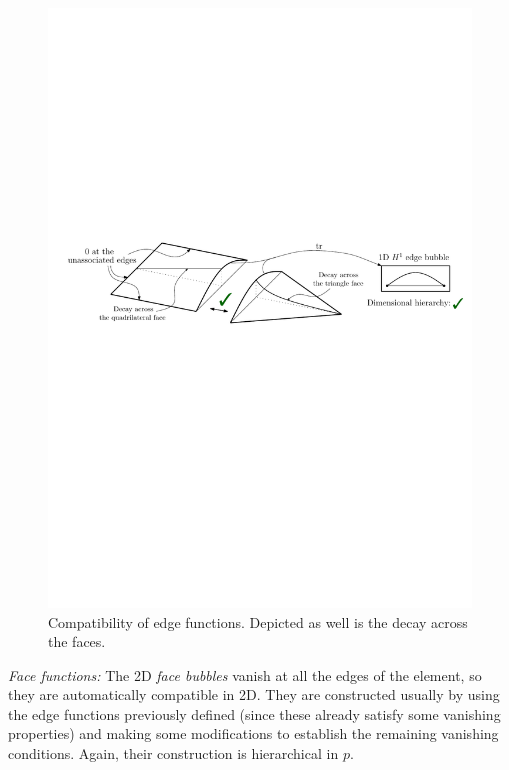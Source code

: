 \begin{figure}[!ht]
\begin{center}
\includegraphics[scale=0.7]{./figures/EdgeBlendingQuadTri.pdf}
\caption{Compatibility of edge functions. Depicted as well is the decay across the faces.}
\label{fig:2Dedgecompatibility}
\end{center}
\end{figure}

\textit{Face functions:}
The 2D \textit{face bubbles} vanish at all the edges of the element, so they are automatically compatible in 2D.
They are constructed usually by using the edge functions previously defined (since these already satisfy some vanishing properties) and making some modifications to establish the remaining vanishing conditions.
Again, their construction is hierarchical in $p$.

